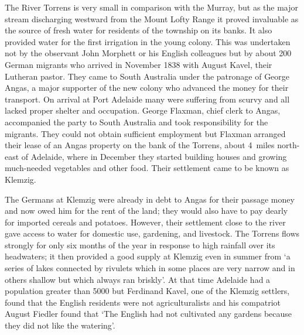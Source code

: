 The River Torrens is very small in comparison with the Murray, but as
the major stream discharging westward from the Mount Lofty Range it
proved invaluable as the source of fresh water for residents of the
township on its banks.  It also provided water for the first
irrigation in the young colony.  This was undertaken not by the
observant John Morphett or his English colleagues but by about 200
German migrants who arrived in November 1838 with August Kavel, their
Lutheran pastor.  They came to South Australia under the patronage of
George Angas, a major supporter of the new colony who advanced the
money for their transport. On arrival at Port Adelaide many were
suffering from scurvy and all lacked proper shelter and
occupation. George Flaxman, chief clerk to Angas, accompanied the
party to South Australia and took responsibility for the migrants.
They could not obtain sufficient employment but Flaxman arranged their
lease of an Angas property on the bank of the Torrens, about 4~miles
north-east of Adelaide, where in December they started building houses
and growing much-needed vegetables and other food.  Their settlement
came to be known as Klemzig.

The Germans at Klemzig were already in debt to Angas for their passage
money and now owed him for the rent of the land; they would also have
to pay dearly for imported cereals and potatoes.  However, their
settlement close to the river gave access to water for domestic use,
gardening, and livestock.  The Torrens flows strongly for only six
months of the year in response to high rainfall over its headwaters;
it then provided a good supply at Klemzig even in summer from `a
series of lakes connected by rivulets which in some places are very
narrow and in others shallow but which always ran briskly'.  At that
time Adelaide had a population greater than 5000 but Ferdinand Kavel,
one of the Klemzig settlers, found that the English residents were not
agriculturalists and his compatriot August Fiedler found that `The
English had not cultivated any gardens because they did not like the
watering'.

